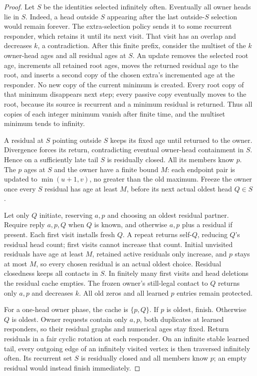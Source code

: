 \documentclass[11pt]{article}
\begin{document}
\begin{proof}
Let $S$ be the identities selected infinitely often. Eventually
all owner heads lie in $S$. Indeed, a head outside $S$ appearing
after the last outside-$S$ selection would remain forever.
The extra-selection policy sends it to some recurrent responder,
which retains it until its next visit. That visit has an overlap
and decreases $k$, a contradiction. After this finite prefix,
consider the multiset of the $k$ owner-head ages and all residual
ages at $S$. An update removes the selected root age, increments
all retained root ages, moves the returned residual age to the
root, and inserts a second copy of the chosen extra's incremented
age at the responder. No new copy of the current minimum is
created. Every root copy of that minimum disappears next step;
every passive copy eventually moves to the root, because its
source is recurrent and a minimum residual is returned. Thus
all copies of each integer minimum vanish after finite time,
and the multiset minimum tends to infinity.

A residual at $S$ pointing outside $S$ keeps its fixed age until
returned to the owner. Divergence forces its return, contradicting
eventual owner-head containment in $S$. Hence on a sufficiently
late tail $S$ is residually closed. All its members know $p$.
The $p$ ages at $S$ and the owner have a finite bound $M$:
each endpoint pair is updated to $\min(u+1,v)$, no greater than
the old maximum. Freeze the owner once every $S$ residual has
age at least $M$, before its next actual oldest head $Q\in S$.

Let only $Q$ initiate, reserving $a,p$ and choosing an oldest
residual partner. Require reply $a,p,Q$ when $Q$ is known,
and otherwise $a,p$ plus a residual if present. Each first
visit installs fresh $Q$. A repeat returns self-$Q$, reducing
$Q$'s residual head count; first visits cannot increase that
count. Initial unvisited residuals have age at least $M$,
retained active residuals only increase, and $p$ stays at most
$M$, so every chosen residual is an actual oldest choice.
Residual closedness keeps all contacts in $S$. In finitely many
first visits and head deletions the residual cache empties.
The frozen owner's still-legal contact to $Q$ returns only
$a,p$ and decreases $k$. All old zeros and all learned $p$
entries remain protected.

For a one-head owner phase, the cache is $\{p,Q\}$. If $p$
is oldest, finish. Otherwise $Q$ is oldest. Owner requests
contain only $a,p$, both duplicates at learned responders,
so their residual graphs and numerical ages stay fixed.
Return residuals in a fair cyclic rotation at each responder.
On an infinite stable learned tail, every outgoing edge of an
infinitely visited vertex is then traversed infinitely often.
Its recurrent set $S$ is residually closed and all members know
$p$; an empty residual would instead finish immediately.


\end{proof}
\end{document}
